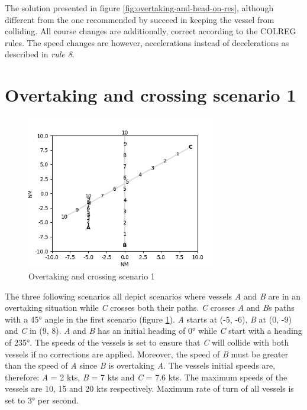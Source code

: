 The solution presented in figure \ref{fig:overtaking-and-head-on-res}, although different from the one recommended by \textcite{ecolreg_overtaking-and-head-on} succeed in keeping the vessel from colliding. All course changes are additionally, correct according to the COLREG rules. The speed changes are however, accelerations instead of decelerations as described in  \textit{rule 8}.


\section{Overtaking and crossing scenario 1}%


\label{sec:overtaking-and-crossing}
\begin{figure}[H]
    \centering
    \includegraphics[width=0.75\textwidth,height=0.75\textheight,keepaspectratio]{../src/img/overtaking_crossing.png}
    \caption[Overtaking and crossing scenario 1]{Overtaking and crossing scenario 1 \cite{ecolreg_overtaking-and-crossing}}
    \label{fig:overtaking-and-crossing}
\end{figure}
The three following scenarios all depict scenarios where vessels \textit{A} and \textit{B} are in an overtaking situation while \textit{C} crosses both their paths. \textit{C} crosses \textit{A} and \textit{B}s paths with a \ang{45}  angle in the first scenario (figure \ref{fig:overtaking-and-crossing}). \textit{A} starts at (-5, -6), \textit{B} at (0, -9) and \textit{C} in (9, 8). \textit{A} and \textit{B} has an initial heading of \ang{0}  while \textit{C} start with a heading of \ang{235}. The speeds of the vessels is set to ensure that \textit{C} will collide with both vessels if no corrections are applied. Moreover, the speed of \textit{B} must be greater than the speed of \textit{A} since \textit{B} is overtaking \textit{A}. The vessels initial speeds are, therefore: \textit{A} = 2 kts, \textit{B} = 7 kts and \textit{C} = 7.6 kts. The maximum speeds of the vessels are 10, 15 and 20 kts respectively. Maximum rate of turn of all vessels is set to \ang{3} per second.

